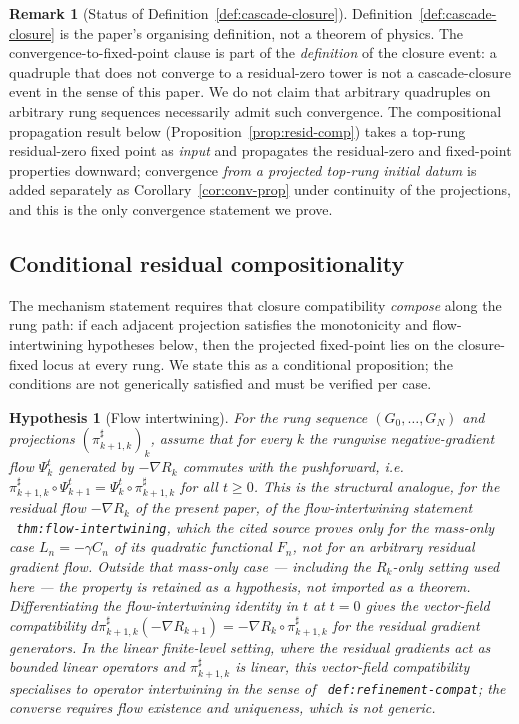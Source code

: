 \documentclass[11pt]{article}
\newtheorem{hypothesis}[theorem]{Hypothesis}
\theoremstyle{definition}
\newtheorem{remark}[theorem]{Remark}
\begin{document}
\begin{remark}[Status of Definition~\ref{def:cascade-closure}]\label{rem:def-status}
Definition~\ref{def:cascade-closure} is the paper's organising
definition, not a theorem of physics. The convergence-to-fixed-point
clause is part of the \emph{definition} of the closure event: a
quadruple that does not converge to a residual-zero tower is not a
cascade-closure event in the sense of this paper. We do not claim that
arbitrary quadruples on arbitrary rung sequences necessarily admit
such convergence. The compositional propagation result below
(Proposition~\ref{prop:resid-comp}) takes a top-rung residual-zero
fixed point as \emph{input} and propagates the residual-zero and
fixed-point properties downward; convergence \emph{from a projected
top-rung initial datum} is added separately as
Corollary~\ref{cor:conv-prop} under continuity of the projections,
and this is the only convergence statement we prove.
\end{remark}

\subsection{Conditional residual compositionality}\label{ssec:residual-comp}

The mechanism statement requires that closure compatibility
\emph{compose} along the rung path: if each adjacent projection
satisfies the monotonicity and flow-intertwining hypotheses below,
then the projected fixed-point lies on the closure-fixed locus at
every rung. We state this as a conditional
proposition; the conditions are not generically satisfied and must be
verified per case.

\begin{hypothesis}[Flow intertwining]\label{hyp:refinement-int}
For the rung sequence $(G_0, \ldots, G_N)$ and projections
$(\pi^{\sharp}_{k+1, k})_{k}$, assume that for every $k$ the rungwise
negative-gradient \emph{flow} $\Psi_k^t$ generated by $-\nabla R_k$
commutes with the pushforward, i.e.\ $\pi^{\sharp}_{k+1, k} \circ \Psi_{k+1}^t
= \Psi_k^t \circ \pi^{\sharp}_{k+1, k}$ for all $t \geq 0$.
This is the structural analogue, for the residual flow $-\nabla R_k$
of the present paper, of the flow-intertwining statement
\cite{CascadeClosureDynamics}~\texttt{thm:flow-intertwining}, which
the cited source proves only for the mass-only case
$L_n = -\gamma C_n$ of its quadratic functional $F_n$, not for an
arbitrary residual gradient flow. Outside that mass-only case ---
including the $R_k$-only setting used here --- the property is
retained as a hypothesis, not imported as a theorem. Differentiating the flow-intertwining identity in $t$ at $t = 0$
gives the vector-field compatibility
$d\pi^{\sharp}_{k+1, k}(-\nabla R_{k+1}) = -\nabla R_k \circ
\pi^{\sharp}_{k+1, k}$
for the residual gradient generators. In the linear finite-level
setting, where the residual gradients act as bounded linear
operators and $\pi^{\sharp}_{k+1, k}$ is linear, this vector-field
compatibility specialises to operator intertwining in the sense of
\cite{CascadeClosureDynamics}~\texttt{def:refinement-compat}; the
converse requires flow existence and uniqueness, which is not
generic.
\end{hypothesis}
\end{document}
